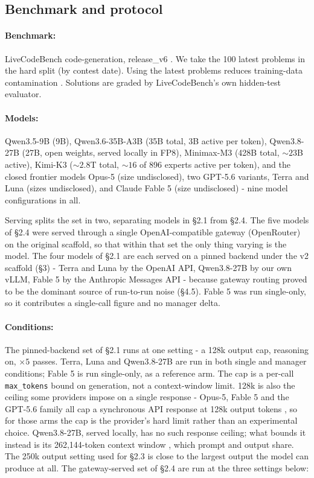 \documentclass[11pt]{article}
\begin{document}
\subsection{Benchmark and protocol}

\paragraph{Benchmark:}
LiveCodeBench code-generation, release\_v6 \cite{jain2024}. We take
the 100 latest problems in the hard split (by contest date). Using the latest problems
reduces training-data contamination \cite{jain2024}. Solutions are graded by
LiveCodeBench's own hidden-test evaluator.

\paragraph{Models:}
Qwen3.5-9B \cite{qwen2026a} (9B), Qwen3.6-35B-A3B \cite{qwen2026b} (35B total, 3B active
per token), Qwen3.8-27B \cite{qwen2026c} (27B, open weights, served locally in FP8), Minimax-M3
\cite{minimax2026} (428B total, ${\sim}23$B active), Kimi-K3
\cite{moonshot2026} (${\sim}2.8$T total, ${\sim}16$ of 896 experts active per token), and
the closed frontier models Opus-5 \cite{anthropic2026} (size undisclosed), two GPT-5.6
variants, Terra and Luna \cite{openai2026} (sizes undisclosed), and Claude Fable 5
\cite{anthropic2026} (size undisclosed) - nine model configurations in all.

Serving splits the set in two, separating models in \S2.1 from
\S2.4. The five models of \S2.4 were served through a single OpenAI-compatible gateway
(OpenRouter) on the original scaffold, so that within that set the only thing varying is
the model. The four models of \S2.1 are each served on a pinned backend under the v2
scaffold (\S3) - Terra and Luna by the OpenAI API, Qwen3.8-27B by our own vLLM, Fable 5 by
the Anthropic Messages API - because gateway routing proved to be the dominant source of
run-to-run noise (\S4.5). Fable 5 was run single-only, so it contributes a single-call
figure and no manager delta.

\paragraph{Conditions:}
The pinned-backend set of \S2.1 runs at one setting - a 128k output cap, reasoning on,
$\times5$ passes. Terra, Luna and Qwen3.8-27B are run in both
single and manager conditions; Fable 5 is run single-only, as a reference arm. The cap is a
per-call \texttt{max\_tokens} bound on generation, not a context-window limit. 128k is
also the ceiling some providers impose on a single response - Opus-5, Fable 5 and the
GPT-5.6 family all cap a synchronous API response at 128k output tokens
\cite{anthropic2026,openai2026}, so for those arms the cap is the provider's hard limit
rather than an experimental choice. Qwen3.8-27B, served locally, has no such response
ceiling; what bounds it instead is its 262{,}144-token context window
\cite{qwen2026c}, which prompt and output share. The 250k output setting used for \S2.3 is close to the largest output the model can produce at
all. The gateway-served set of \S2.4 are run at the three settings below:
\end{document}
